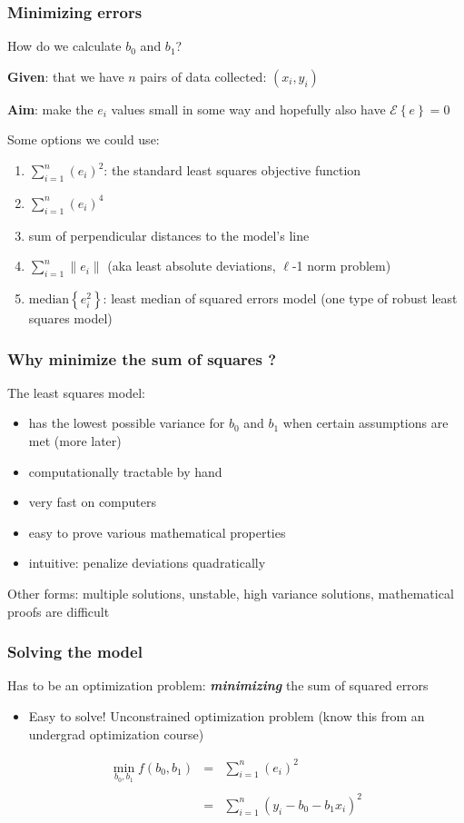 \begin{frame}\frametitle{Minimizing errors}

	How do we calculate $b_0$ and $b_1$?

	\textbf{Given}: that we have $n$ pairs of data collected: $(x_i, y_i)$

	\textbf{Aim}: make the $e_i$ values small in some way and hopefully also have $\mathcal{E}\left\{e\right\} = 0$

	\vspace{24pt}
	Some options we could use:
	\begin{enumerate}
		\item	$\sum_{i=1}^{n}{(e_i)^2}$: the standard least squares objective function
		\item	$\sum_{i=1}^{n}{(e_i)^4}$
		\item	sum of perpendicular distances to the model's line
		\item	$\sum_{i=1}^{n}{\|e_i\|}$ (aka least absolute deviations, $\ell$-1 norm problem)
		\item	$\text{median}\left\{ e_i^2 \right\}$: least median of squared errors model (one type of robust least squares model)
	\end{enumerate}
\end{frame}

\begin{frame}\frametitle{Why minimize the sum of squares ?}

	The least squares model:
	\begin{itemize}
		\item	has the lowest possible variance for $b_0$ and $b_1$ when certain assumptions are met (more later)
		\item	computationally tractable by hand
		\item	very fast on computers
		\item	easy to prove various mathematical properties
		\item	intuitive: penalize deviations quadratically
	\end{itemize}

	Other forms: multiple solutions, unstable, high variance solutions, mathematical proofs are difficult
\end{frame}

\begin{frame}\frametitle{Solving the model}

	Has to be an optimization problem: \textbf{\emph{minimizing}} the sum of squared errors
	\begin{itemize}
		\item	Easy to solve! Unconstrained optimization problem (know this from an undergrad optimization course)
	\end{itemize}

	$$
	\begin{array}{rcl}
		\min_{\displaystyle b_0, b_1} f(b_0, b_1) &=& \sum_{i=1}^{n}{(e_i)^2} \\
		\\
		&=& \sum_{i=1}^{n}{\left(y_i - b_0 - b_1 x_i\right)^2}
	\end{array}
	$$
\end{frame}

